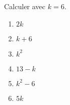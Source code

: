 
\begin{exercice}\label{exosmath-0979}

    Calculer avec \( k=6\).
    \begin{multicols}{3}
    \begin{enumerate}
        \item
            \( 2k\)
        \item
            \( k+6\)
        \item
            \( k^2\)
        \item
            \( 13-k\)
        \item
            \( k^2-6\)
        \item
            \( 5k\)
    \end{enumerate}
    \end{multicols}

\end{exercice}
